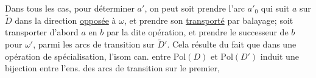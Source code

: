 Dans tous les cas, pour déterminer
$a'$, on peut soit prendre l'arc $a'_0$
qui suit $a$ sur $\widetilde D$ dans la direction
\uline{opposée} à $\omega$, et prendre son \uline{transporté}
par balayage; soit transporter d'abord
$a$ en $b$ par la dite opération, et prendre
le successeur de $b$ pour $\omega'$, parmi
les arcs de transition sur $\widetilde D'$.
Cela résulte du fait que dans une
opération de spécialisation, l'isom can. entre
$\mathrm{Pol}(D)$ et $\mathrm{Pol}(D')$ induit une bijection entre
l'ens. des arcs de transition sur le premier,
